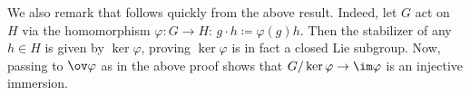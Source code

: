 \documentclass[../notes.tex]{subfiles}
\begin{document}
\begin{remark} \label{rem:isomorphism-theorem}
	We also remark that  follows quickly from the above result. Indeed, let $G$ act on $H$ via the homomorphism $\varphi\colon G\to H$: $g\cdot h\coloneqq\varphi(g)h$. Then the stabilizer of any $h\in H$ is given by $\ker\varphi$, proving $\ker\varphi$ is in fact a closed Lie subgroup. Now, passing to $\ov\varphi$ as in the above proof shows that $G/\ker\varphi\to\im\varphi$ is an injective immersion.
\end{remark}
\end{document}
